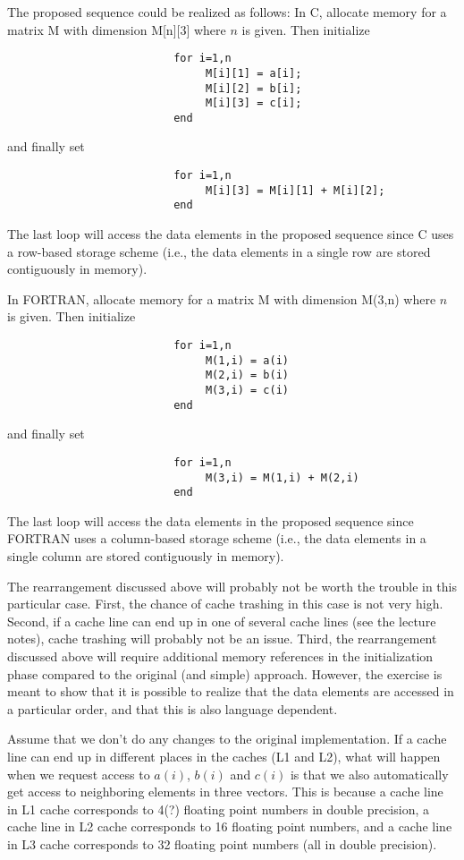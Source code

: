 \documentclass[11pt]{article}
\begin{document}
The proposed sequence could be realized as follows: 
In C, allocate memory for a matrix M with dimension M[n][3] where $n$ is given.
Then initialize 
\begin{verbatim}
                          for i=1,n
                               M[i][1] = a[i];
                               M[i][2] = b[i];
                               M[i][3] = c[i];
                          end
\end{verbatim}
and finally set
\begin{verbatim}
                          for i=1,n
                               M[i][3] = M[i][1] + M[i][2]; 
                          end
\end{verbatim}
The last loop will access the data elements in the proposed sequence
since C uses a row-based storage scheme
(i.e., the data elements in a single row are stored contiguously in memory).

In FORTRAN, allocate memory for a matrix M with dimension M(3,n) where $n$ is given.
Then initialize 
\begin{verbatim}
                          for i=1,n
                               M(1,i) = a(i)
                               M(2,i) = b(i)
                               M(3,i) = c(i)
                          end
\end{verbatim}
and finally set
\begin{verbatim}
                          for i=1,n
                               M(3,i) = M(1,i) + M(2,i) 
                          end
\end{verbatim}
The last loop will access the data elements in the proposed sequence
since \\FORTRAN uses a column-based storage scheme
(i.e., the data elements in a single column are stored contiguously in memory). 

The rearrangement discussed above will probably not be worth the trouble 
in this particular case. First, the chance of cache trashing in this case 
is not very high. 
Second, if a cache line can end up in one of several cache lines 
(see the lecture notes), cache trashing will probably not be an issue. 
Third, the rearrangement discussed above will require additional 
memory references in the initialization phase compared to the original 
(and simple) approach. However, the exercise is meant to show that 
it is possible to realize that the data elements are accessed in a particular order,
and that this is also language dependent. 

Assume that we don't do any changes to the original implementation. 
If a cache line can end up in different places in the caches (L1 and L2), 
what will happen when we request access to $a(i)$, $b(i)$ and $c(i)$ 
is that we also automatically get access to neighboring elements in three vectors. 
This is because a cache line in L1 cache corresponds to 4(?) floating point numbers 
in double precision, a cache line in L2 cache corresponds to 16 
floating point numbers, and a cache line in L3 cache corresponds to 32 floating point 
numbers (all in double precision). 
\end{document}
